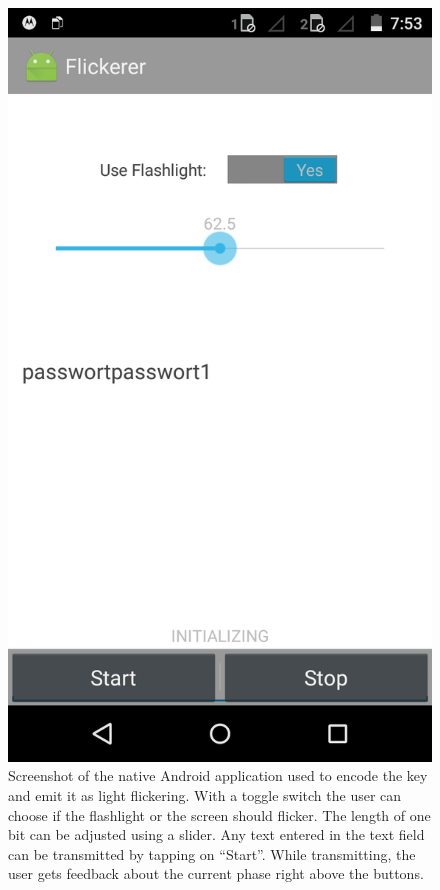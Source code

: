 \documentclass{sig-alternate} %
\begin{document}
\begin{figure}
	\centering
	\includegraphics[scale=.15]{images/screen_native.png}
	\caption{Screenshot of the native Android application used to encode the key and emit it as light flickering. With a toggle switch the user can choose if the flashlight or the screen should flicker. The length of one bit can be adjusted using a slider. Any text entered in the text field can be transmitted by tapping on ``Start''. While transmitting, the user gets feedback about the current phase right above the buttons.}
	\label{fig:screenshot}
\end{figure}
\end{document}
